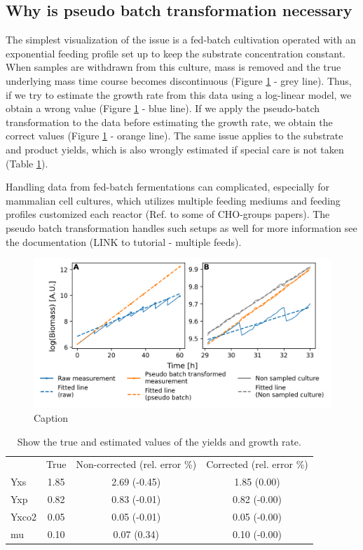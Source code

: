 \documentclass{bioinfo}
\begin{document}
\subsection{Why is pseudo batch transformation necessary}
The simplest visualization of the issue is a fed-batch cultivation operated with an exponential feeding profile set up to keep the substrate concentration constant. When samples are withdrawn from this culture, mass is removed and the true underlying mass time course becomes discontinuous (Figure \ref{fig:pseudo_batch_growth_rate} - grey line). Thus, if we try to estimate the growth rate from this data using a log-linear model, we obtain a wrong value (Figure \ref{fig:pseudo_batch_growth_rate} - blue line). If we apply the pseudo-batch transformation to the data before estimating the growth rate, we obtain the correct values (Figure \ref{fig:pseudo_batch_growth_rate} - orange line). The same issue applies to the substrate and product yields, which is also wrongly estimated if special care is not taken (Table \ref{tab:compare_estimates}). 

Handling data from fed-batch fermentations can complicated, especially for mammalian cell cultures, which utilizes multiple feeding mediums and feeding profiles customized each reactor (Ref. to some of CHO-groups papers). The pseudo batch transformation handles such setups as well for more information see the documentation (LINK to tutorial - multiple feeds).

\begin{figure}
    \centering
    \includegraphics[width = 0.4 \textwidth]{figures/transformed_and_non-transformed_logscale_paper.png}
    \caption{Caption}
    \label{fig:pseudo_batch_growth_rate}
\end{figure}

\begin{table}
    \caption{Show the true and estimated values of the yields and growth rate.}
    \label{tab:compare_estimates}
    \begin{tabular}{lccc}
     & True & Non-corrected (rel. error \%) & Corrected (rel. error \%) \\
    Yxs & 1.85 & 2.69 (-0.45) & 1.85 (0.00) \\
    Yxp & 0.82 & 0.83 (-0.01) & 0.82 (-0.00) \\
    Yxco2 & 0.05 & 0.05 (-0.01) & 0.05 (-0.00) \\
    mu & 0.10 & 0.07 (0.34) & 0.10 (-0.00) \\
    \end{tabular}
\end{table}
\end{document}
